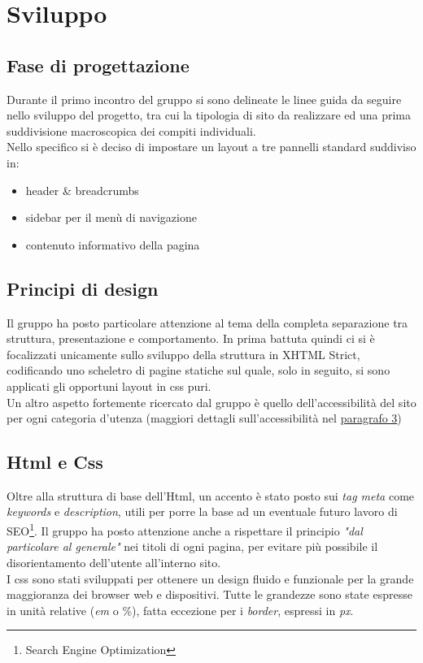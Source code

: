 \section{Sviluppo}

\vspace{8px}

\subsection{Fase di progettazione}
Durante il primo incontro del gruppo si sono delineate le linee guida da seguire nello sviluppo del progetto, tra cui la tipologia di sito da realizzare ed una prima suddivisione macroscopica dei compiti individuali.\\
Nello specifico si è deciso di impostare un layout a tre pannelli standard suddiviso in:
\begin{itemize}
 \item header \& breadcrumbs
 \item sidebar per il menù di navigazione
 \item contenuto informativo della pagina
\end{itemize}

\vspace{8px}

\subsection{Principi di design}
Il gruppo ha posto particolare attenzione al tema della completa separazione tra struttura, presentazione e comportamento. In prima battuta quindi ci si è focalizzati unicamente sullo sviluppo della struttura in XHTML Strict, codificando uno scheletro di pagine statiche sul quale, solo in seguito, si sono applicati gli opportuni layout in css puri.\\
Un altro aspetto fortemente ricercato dal gruppo è quello dell'accessibilità del sito per ogni categoria d'utenza (maggiori dettagli sull'accessibilità nel \hyperref[sec:access]{paragrafo 3})  

\pagebreak

\subsection{Html e Css}
Oltre alla struttura di base dell'Html, un accento è stato posto sui \emph{tag meta} come \emph{keywords} e \emph{description}, utili per porre la base ad un eventuale futuro lavoro di SEO\footnote{Search Engine Optimization}. Il gruppo ha posto attenzione anche a rispettare il principio \emph{"dal particolare al generale"} nei titoli di ogni pagina, per evitare più possibile il disorientamento dell'utente all'interno sito.\\
I css sono stati sviluppati per ottenere un design fluido e funzionale per la grande maggioranza dei browser web e dispositivi. Tutte le grandezze sono state espresse in unità relative (\emph{em} o \%), fatta eccezione per i \emph{border}, espressi in \emph{px}. 

